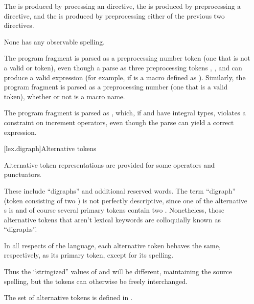 \documentclass{wg21}
\begin{document}
\pnum
The  is produced
by processing an  directive,
the  is produced
by preprocessing a  directive, and
the  is produced
by preprocessing either of the previous two directives.
\begin{note}
    None has any observable spelling.
\end{note}

\pnum
\begin{example}
    The program fragment  is parsed as a
    preprocessing number token (one that is not a valid
     or  token),
    even though a parse as three preprocessing tokens
    , \tcode{+}, and  can produce a valid expression (for example,
    if  is a macro defined as ). Similarly, the
    program fragment  is parsed as a preprocessing number (one
    that is a valid  token),
    whether or not  is a macro name.
\end{example}

\pnum
\begin{example}
    The program fragment  is parsed as , which, if  and  have integral types,
    violates a constraint on increment operators, even though the parse
     can yield a correct expression.
\end{example}

[lex.digraph]{Alternative tokens}

\pnum
{}%
Alternative token representations are provided for some operators and
punctuators.
\begin{wfootnote}
    These include ``digraphs'' and additional reserved words. The term
    ``digraph'' (token consisting of two ) is not perfectly
    descriptive, since one of the alternative s is
    \tcode{\%:\%:} and of course several primary tokens contain two
     . Nonetheless, those alternative tokens that aren't lexical
    keywords are colloquially known as ``digraphs''.
\end{wfootnote}

\pnum
In all respects of the language, each alternative token behaves the
same, respectively, as its primary token, except for its spelling.
\begin{wfootnote}
    Thus the ``stringized'' values of
    \tcode{[} and \tcode{<:} will be different, maintaining the source
    spelling, but the tokens can otherwise be freely interchanged.
\end{wfootnote}
The set of alternative tokens is defined in
.
\end{document}
